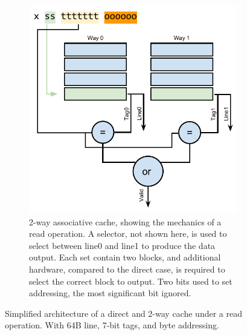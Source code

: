 \begin{figure}
\begin{subfigure}[b]{0.48\textwidth}
        \includegraphics[width=\textwidth]{figures/introduction/2waycache_read}
        \caption{2-way associative cache, showing the mechanics of a read operation. A selector, not shown here, is used to select between line0 and line1 to produce the data output. Each set contain two blocks, and additional hardware, compared to the direct case, is required to select the correct block to output. Two bits used to set addressing, the most significant bit ignored.}
        \label{fig:introduction:cache:2way}
    \end{subfigure}
    \caption{Simplified architecture of a direct and 2-way cache under a read operation. With 64B line, 7-bit tags, and byte addressing.}
    \label{fig:introduction:cache}
\end{figure}


